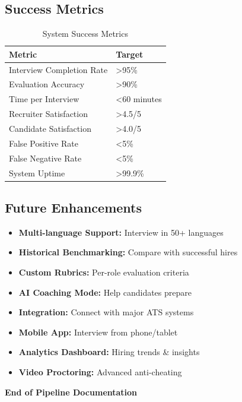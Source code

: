 \documentclass[12pt,a4paper]{article}
\begin{document}
\subsection{Success Metrics}

\begin{table}[h!]
\centering
\begin{tabular}{|l|l|}
\hline
\textbf{Metric} & \textbf{Target} \\
\hline
Interview Completion Rate & >95\% \\
Evaluation Accuracy & >90\% \\
Time per Interview & <60 minutes \\
Recruiter Satisfaction & >4.5/5 \\
Candidate Satisfaction & >4.0/5 \\
False Positive Rate & <5\% \\
False Negative Rate & <5\% \\
System Uptime & >99.9\% \\
\hline
\end{tabular}
\caption{System Success Metrics}
\end{table}

\subsection{Future Enhancements}

\begin{itemize}
    \item \textbf{Multi-language Support:} Interview in 50+ languages
    \item \textbf{Historical Benchmarking:} Compare with successful hires
    \item \textbf{Custom Rubrics:} Per-role evaluation criteria
    \item \textbf{AI Coaching Mode:} Help candidates prepare
    \item \textbf{Integration:} Connect with major ATS systems
    \item \textbf{Mobile App:} Interview from phone/tablet
    \item \textbf{Analytics Dashboard:} Hiring trends \& insights
    \item \textbf{Video Proctoring:} Advanced anti-cheating
\end{itemize}

\vspace{1cm}

\begin{center}
\Large\textbf{End of Pipeline Documentation}
\end{center}
\end{document}
